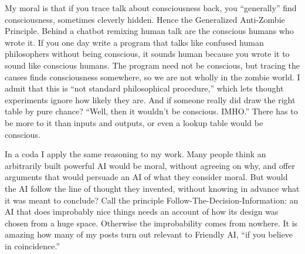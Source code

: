 My moral is that if you trace talk about consciousness back, you ``generally'' find consciousness, sometimes cleverly hidden. Hence the Generalized Anti-Zombie Principle. Behind a chatbot remixing human talk are the conscious humans who wrote it. If you one day write a program that talks like confused human philosophers without being conscious, it sounds human because you wrote it to sound like conscious humans. The program need not be conscious, but tracing the causes finds consciousness somewhere, so we are not wholly in the zombie world. I admit that this is ``not standard philosophical procedure,'' which lets thought experiments ignore how likely they are. And if someone really did draw the right table by pure chance? ``Well, then it wouldn't be conscious. IMHO.'' There has to be more to it than inputs and outputs, or even a lookup table would be conscious. 

In a coda I apply the same reasoning to my work. Many people think an arbitrarily built powerful AI would be moral, without agreeing on why, and offer arguments that would persuade an AI of what they consider moral. But would the AI follow the line of thought they invented, without knowing in advance what it was meant to conclude? Call the principle Follow-The-Decision-Information: an AI that does improbably nice things needs an account of how its design was chosen from a huge space. Otherwise the improbability comes from nowhere. It is amazing how many of my posts turn out relevant to Friendly AI, ``if you believe in coincidence.''
